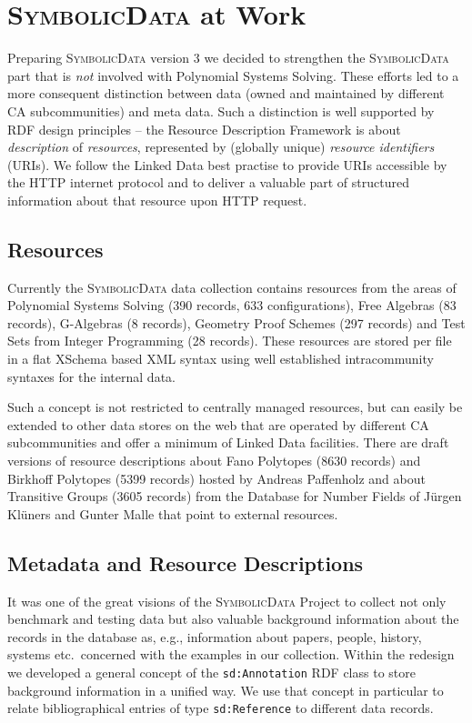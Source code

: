 \documentclass{svmult}
\newcommand{\SD}{\textsc{Symbolic\-Data}}
\begin{document}
\section{{\SD} at Work}

Preparing {\SD} version 3 we decided to strengthen the {\SD} part that is
\emph{not} involved with Polynomial Systems Solving.  These efforts led to a
more consequent distinction between data (owned and maintained by different CA
subcommunities) and meta data. Such a distinction is well supported by RDF
design principles -- the Resource Description Framework is about
\emph{description} of \emph{resources}, represented by (globally unique)
\emph{resource identifiers} (URIs). We follow the Linked Data best practise to
provide URIs accessible by the HTTP internet protocol and to deliver a
valuable part of structured information about that resource upon HTTP request.

\subsection{Resources}

Currently the {\SD} data collection contains resources from the areas of
Polynomial Systems Solving (390 records, 633 configurations), Free Algebras
(83 records), G-Algebras (8 records), Geometry Proof Schemes (297 records) and
Test Sets from Integer Programming (28 records). These resources are stored
per file in a flat XSchema based XML syntax using well established
intracommunity syntaxes for the internal data.

Such a concept is not restricted to centrally managed resources, but can
easily be extended to other data stores on the web that are operated by
different CA subcommunities and offer a minimum of Linked Data facilities.
There are draft versions of resource descriptions about Fano Polytopes (8630
records) and Birkhoff Polytopes (5399 records) hosted by Andreas Paffenholz
and about Transitive Groups (3605 records) from the Database for Number Fields
of J\"urgen Kl\"uners and Gunter Malle that point to external resources. 

\subsection{Metadata and Resource Descriptions}

It was one of the great visions of the {\SD} Project to collect not only
benchmark and testing data but also valuable background information about the
records in the database as, e.g., information about papers, people, history,
systems etc.\ concerned with the examples in our collection.  Within the
redesign we developed a general concept of the \texttt{sd:Annotation} RDF
class to store background information in a unified way.  We use that concept
in particular to relate bibliographical entries of type \texttt{sd:Reference}
to different data records.
\end{document}

